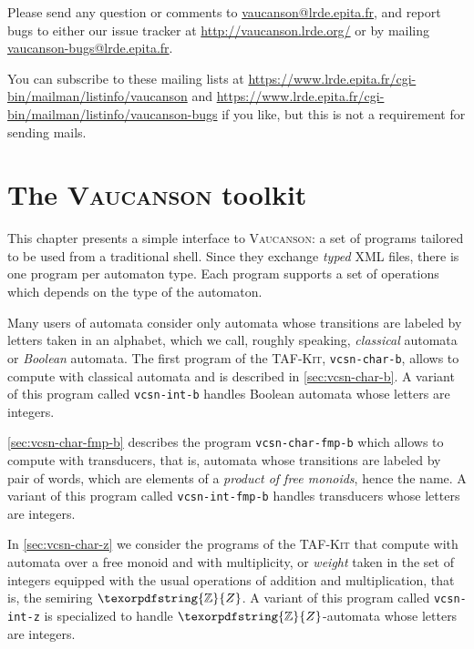 \documentclass[a4paper]{report}
\renewcommand{\max}{\textrm{max}}
\renewcommand{\min}{\textrm{min}}
\newcommand{\Z}{\texorpdfstring{\ensuremath{\mathbb{Z}}}{Z}}
\newcommand\command[1]{\texttt{#1}}
\newcommand{\tafkit}{\textsc{TAF-Kit}\xspace}
\newcommand{\Vauc}{\textsc{Vaucanson}\xspace}
\begin{document}
Please send any question or comments to \url{vaucanson@lrde.epita.fr}, and
report bugs to either our issue tracker at \url{http://vaucanson.lrde.org/} or
by mailing \url{vaucanson-bugs@lrde.epita.fr}.

You can subscribe to these mailing lists at
\url{https://www.lrde.epita.fr/cgi-bin/mailman/listinfo/vaucanson} and
\url{https://www.lrde.epita.fr/cgi-bin/mailman/listinfo/vaucanson-bugs}
if you like, but this is not a requirement for sending mails.

\chapter{The \Vauc toolkit}
\label{sec:tafkit}

This chapter presents a simple interface to \Vauc: a set of programs
tailored to be used from a traditional shell.  Since they exchange
\emph{typed} XML files, there is one program per automaton type.  Each
program supports a set of operations which depends on the type of the
automaton.

Many users of automata consider only automata whose transitions are
labeled by letters taken in an alphabet, which we call, roughly
speaking, \emph{classical} automata or \emph{Boolean} automata.  The
first program of the \tafkit, \command{vcsn-char-b}, allows to compute
with classical automata and is described in \autoref{sec:vcsn-char-b}.
A variant of this program called \command{vcsn-int-b} handles Boolean
automata whose letters are integers.

\autoref{sec:vcsn-char-fmp-b} describes the program
\command{vcsn-char-fmp-b} which allows to compute with transducers, that
is, automata whose transitions are labeled by pair of words, which are
elements of a \emph{product of free monoids}, hence the name.  A
variant of this program called \command{vcsn-int-fmp-b} handles
transducers whose letters are integers.

In \autoref{sec:vcsn-char-z} we consider the programs of the \tafkit
that compute with automata over a free monoid and with multiplicity,
or \emph{weight} taken in the set of integers equipped with the usual
operations of addition and multiplication, that is, the semiring $\Z$.
A variant of this program called \command{vcsn-int-z} is specialized
to handle $\Z$-automata whose letters are integers.

\end{document}

